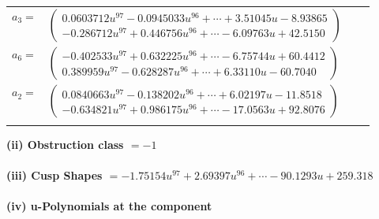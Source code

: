 \documentclass[1p]{elsarticle_modified}
\theoremstyle{definition}
\begin{document}
\begin{tabular}{m{7pt} m{180pt} m{7pt} m{180pt} }
\flushright $a_{3}=$&$\begin{pmatrix}0.0603712 u^{97}-0.0945033 u^{96}+\cdots+3.51045 u-8.93865\\-0.286712 u^{97}+0.446756 u^{96}+\cdots-6.09763 u+42.5150\end{pmatrix}$ \\
\flushright $a_{6}=$&$\begin{pmatrix}-0.402533 u^{97}+0.632225 u^{96}+\cdots-6.75744 u+60.4412\\0.389959 u^{97}-0.628287 u^{96}+\cdots+6.33110 u-60.7040\end{pmatrix}$ \\
\flushright $a_{2}=$&$\begin{pmatrix}0.0840663 u^{97}-0.138202 u^{96}+\cdots+6.02197 u-11.8518\\-0.634821 u^{97}+0.986175 u^{96}+\cdots-17.0563 u+92.8076\end{pmatrix}$\\&\end{tabular}
\flushleft \textbf{(ii) Obstruction class $= -1$}\\~\\
\flushleft \textbf{(iii) Cusp Shapes $= -1.75154 u^{97}+2.69397 u^{96}+\cdots-90.1293 u+259.318$}\\~\\
\newpage\renewcommand{\arraystretch}{1}
\flushleft \textbf{(iv) u-Polynomials at the component}\newline \\
\end{document}
